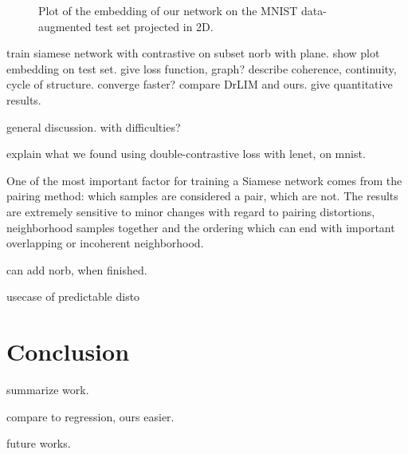 \documentclass[a4paper,12pt]{report}
\begin{document}
\begin{figure}[t]
\begin{subfigure}[t]{0.75\textwidth}
    \end{subfigure}
    \caption{Plot of the embedding of our network on the MNIST data-augmented test set projected in 2D.}
    \label{fig:mnist_cl2d}
\end{figure}

train siamese network with contrastive on subset norb with plane.
show plot embedding on test set.
give loss function, graph?
describe coherence, continuity, cycle of structure.
converge faster?
compare DrLIM and ours.
give quantitative results.

general discussion.
with difficulties?

explain what we found using double-contrastive loss with lenet, on mnist.

One of the most important factor for training a Siamese network comes from the pairing method: which samples are considered a pair, which are not.
The results are extremely sensitive to minor changes with regard to pairing distortions, neighborhood samples together and the ordering which can end with important overlapping or incoherent neighborhood.

can add norb, when finished.

usecase of predictable disto


\chapter{Conclusion}

summarize work.

compare to regression, ours easier.

future works.

{}


\nocite{lecun2004learning}
\end{document}
